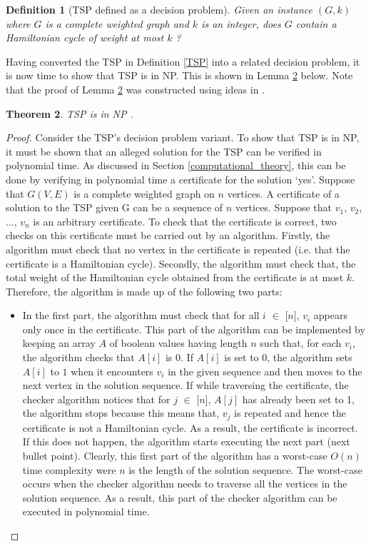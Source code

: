 \documentclass[12pt]{article}
\newtheorem{definition}{Definition}[subsection]
\newtheorem{theorem}[definition]{Theorem}
\numberwithin{equation}{subsection}
\numberwithin{table}{subsection}
\numberwithin{algorithm}{subsection}
\numberwithin{figure}{subsection}
\begin{document}
\begin{definition}[TSP defined as a decision problem]
\label{dec_prob}
Given an instance $(G,k)$ where $G$ is a complete weighted graph and $k$ is an integer, does $G$ contain a Hamiltonian cycle of weight at most $k$ \cite{cormen_leiserson_rivest_stein}?
\end{definition}
Having converted the TSP in Definition \ref{TSP} into a related decision problem, it is now time to show that TSP is in NP. This is shown in Lemma \ref{TSP_in_NP} below. Note that the proof of Lemma \ref{TSP_in_NP} was constructed using ideas in \cite{cormen_leiserson_rivest_stein}.
\begin{theorem}
\label{TSP_in_NP}
TSP is in NP {}.
\end{theorem}
\begin{proof}
Consider the TSP's decision problem variant. To show that TSP is in NP, it must be shown that an alleged solution for the TSP can be verified in polynomial time. As discussed in Section \ref{computational_theory}, this can be done by verifying in polynomial time a certificate for the solution `yes'. Suppose that $G(V,E)$ is a complete weighted graph on $n$ vertices. A certificate of a solution to the TSP given G can be a sequence of $n$ vertices. Suppose that $v_1$, $v_2$, ..., $v_n$ is an arbitrary certificate. To check that the certificate is correct, two checks on this certificate must be carried out by an algorithm. Firstly, the algorithm must check that no vertex in the certificate is repeated (i.e. that the certificate is a Hamiltonian cycle). Secondly, the algorithm must check that, the total weight of the Hamiltonian cycle obtained from the certificate is at most $k$. Therefore, the algorithm is made up of the following two parts:
\begin{itemize}
   \item In the first part, the algorithm must check that for all $i$ $\in$ [$n$], $v_i$ appears only once in the certificate. This part of the algorithm can be implemented by keeping an array $A$ of boolean values having length $n$ such that, for each $v_i$, the algorithm checks that $A[i]$ is $0$. If $A[i]$ is set to $0$, the algorithm sets $A[i]$ to $1$ when it encounters $v_i$ in the given sequence and then moves to the next vertex in the solution sequence. If while traversing the certificate, the checker algorithm notices that for $j$ $\in$ [$n$], $A[j]$ has already been set to 1, the algorithm stops because this means that, $v_j$ is repeated and hence the certificate is not a Hamiltonian cycle. As a result, the certificate is incorrect. If this does not happen, the algorithm starts executing the next part (next bullet point). Clearly, this first part of the algorithm has a worst-case $O(n)$ time complexity were $n$ is the length of the solution sequence. The worst-case occurs when the checker algorithm needs to traverse all the vertices in the solution sequence. As a result, this part of the checker algorithm can be executed in polynomial time.

\end{itemize}
\end{proof}
\end{document}

